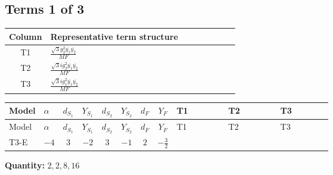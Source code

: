 \documentclass[8pt]{article}
\begin{document}
\begin{landscape}
\subsection*{Terms 1 of 3}
\begin{center}
\begin{tabular}{@{}c >{\raggedright\arraybackslash}p{0.82\linewidth}@{}}
\toprule
Column & Representative term structure \\
\midrule
T1 & \(\displaystyle \frac{\sqrt{3} g_{2}^{2} \overline{y_{1}} \overline{y_{2}}}{MF}\) \\
\midrule
T2 & \(\displaystyle \frac{\sqrt{3} i g_{2}^{2} \overline{y_{1}} \overline{y_{2}}}{MF}\) \\
\midrule
T3 & \(\displaystyle \frac{\sqrt{3} i g_{1}^{2} \overline{y_{1}} \overline{y_{2}}}{MF}\) \\
\midrule
\bottomrule
\end{tabular}
\end{center}
\smallskip
\tiny
\begin{longtable}{@{}llcccccc >{\raggedright\arraybackslash}p{0.21\linewidth} >{\raggedright\arraybackslash}p{0.21\linewidth} >{\raggedright\arraybackslash}p{0.21\linewidth}@{}}
\toprule
Model & $\alpha$ & $d_{S_1}$ & $Y_{S_1}$ & $d_{S_2}$ & $Y_{S_2}$ & $d_F$ & $Y_F$ & T1 & T2 & T3 \\
\midrule
\endfirsthead
\toprule
Model & $\alpha$ & $d_{S_1}$ & $Y_{S_1}$ & $d_{S_2}$ & $Y_{S_2}$ & $d_F$ & $Y_F$ & T1 & T2 & T3 \\
\midrule
\endhead
T3-E & $-4$ & $3$ & $-2$ & $3$ & $-1$ & $2$ & $-\frac{3}{2}$ & \scriptsize\adjustbox{max width=\linewidth}{$\begin{gathered} \frac{\sqrt{3} g_{2}^{2} \overline{y_{1}} \overline{y_{2}}}{6 MF}\end{gathered}$} & \scriptsize\adjustbox{max width=\linewidth}{$\begin{gathered} - \frac{49 \sqrt{3} i g_{2}^{2} \overline{y_{1}} \overline{y_{2}}}{24 MF}\end{gathered}$} & \scriptsize\adjustbox{max width=\linewidth}{$\begin{gathered} - \frac{9 \sqrt{3} i g_{1}^{2} \overline{y_{1}} \overline{y_{2}}}{8 MF}\end{gathered}$} \\
\midrule
\bottomrule
\end{longtable}
\clearpage
\noindent\textbf{Quantity: }$\mathrm{2,2,8,16}$\par\smallskip

\end{landscape}
\end{document}
